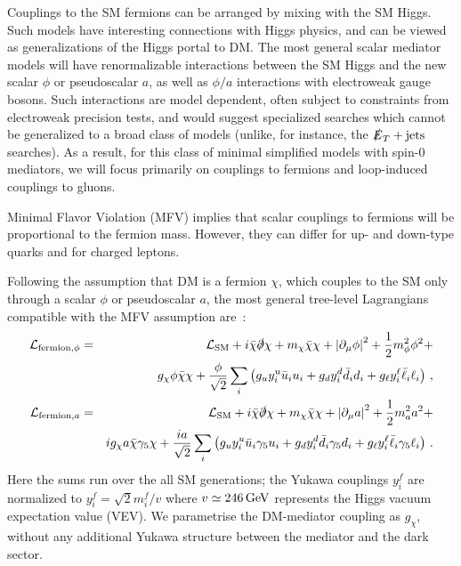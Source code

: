 Couplings to the SM fermions can be arranged by mixing with the SM Higgs. Such models have interesting connections with Higgs physics, and can be viewed as generalizations of the Higgs portal to DM. The most general scalar mediator models will have renormalizable interactions between the SM Higgs and the new scalar $\phi$ or pseudoscalar $a$, as well as $\phi/a$ interactions with electroweak gauge bosons. Such interactions are model dependent, often subject to constraints from electroweak precision tests, and would suggest specialized searches which cannot be generalized to a broad class of models (unlike, for instance, the $\slashed{E}_T+\textrm{jets}$ searches). As a result, for this class of minimal simplified models with spin-$0$ mediators, we will focus primarily on couplings to fermions and loop-induced couplings to gluons. %


Minimal Flavor Violation (MFV) implies that scalar couplings to fermions will be proportional to the fermion mass.  However, they can differ for up- and down-type quarks and for charged leptons. 

Following the assumption that DM is a fermion $\chi$, which couples to the SM only through a scalar $\phi$ or pseudoscalar $a$, the most general tree-level Lagrangians compatible with the MFV assumption are~\citep{Cotta:2013jna,Abdullah:2014lla,Buckley:2014fba}:
 \begin{eqnarray}
{\cal L}_{{\rm fermion},\phi} & = & {\cal L}_{\rm SM}+i\bar{\chi} \slashed{\partial} \chi + m_\chi \bar{\chi}\chi + \left| \partial_\mu \phi \right|^2+\frac{1}{2}m_\phi^2 \phi^2 + \nonumber \\ 
& &  g_\chi \phi \bar{\chi}\chi+ \frac{\phi}{\sqrt{2}} \sum_i \left(g_u y_i^u \bar{u}_i u_i+g_d y_i^d \bar{d}_i d_i+g_\ell y_i^\ell \bar{\ell}_i \ell_i\right)\, , \label{eq:scalarlag} \\
{\cal L}_{{\rm fermion},a} & = & {\cal L}_{\rm SM}+i\bar{\chi} \slashed{\partial} \chi + m_\chi \bar{\chi}\chi + \left| \partial_\mu a \right|^2+\frac{1}{2}m_a^2 a^2 + \nonumber \\
& &  ig_\chi a \bar{\chi}\gamma_5\chi+ \frac{i a}{\sqrt{2}}\sum_i  \left(g_u y_i^u \bar{u}_i \gamma_5 u_i+g_d y_i^d \bar{d}_i \gamma_5 d_i+g_\ell y_i^\ell   \bar{\ell}_i \gamma_5 \ell_i\right) \,. \label{eq:pseudoscalarlag}
\end{eqnarray}
Here the sums run over the all SM generations; the Yukawa couplings $y_i^f$ are normalized to $y_i^f = \sqrt{2}m_i^f/v$ where $v \simeq 246 \, {\rm GeV}$ represents the Higgs vacuum expectation value (VEV). We parametrise the DM-mediator coupling as $g_\chi$, without any additional Yukawa structure between the mediator and the dark sector.

